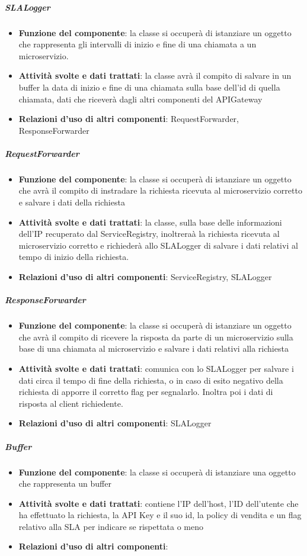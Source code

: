 \subparagraph{SLALogger}
\begin{itemize}
	\item \textbf{Funzione del componente}: la classe si occuper\`{a} di istanziare un oggetto che rappresenta gli intervalli di inizio e fine di una chiamata a un microservizio.
	\item \textbf{Attivit\`{a} svolte e dati trattati}:  la classe avr\`{a} il compito di salvare in un buffer la data di inizio e fine di una chiamata sulla base dell'id di quella chiamata, dati che ricever\`{a} dagli altri componenti del APIGateway
	\item \textbf{Relazioni d'uso di altri componenti}: RequestForwarder, ResponseForwarder
\end{itemize}

\subparagraph{RequestForwarder}
\begin{itemize}
	\item \textbf{Funzione del componente}: la classe si occuper\`{a} di istanziare un oggetto che avr\`{a} il compito di instradare la richiesta ricevuta al microservizio corretto e salvare i dati della richiesta
	\item \textbf{Attivit\`{a} svolte e dati trattati}: la classe, sulla base delle informazioni dell'IP recuperato dal ServiceRegistry, inoltrera\`{a} la richiesta ricevuta al microservizio corretto e richieder\`{a} allo SLALogger di salvare i dati relativi al tempo di inizio della richiesta.
	\item \textbf{Relazioni d'uso di altri componenti}: ServiceRegistry, SLALogger
\end{itemize}

\subparagraph{ResponseForwarder}
\begin{itemize}
	\item \textbf{Funzione del componente}: la classe si occuper\`{a} di istanziare un oggetto che avr\`{a} il compito di ricevere la risposta da parte di un microservizio sulla base di una chiamata al microservizio e salvare i dati relativi alla richiesta
	\item \textbf{Attivit\`{a} svolte e dati trattati}: comunica con lo SLALogger per salvare i dati circa il tempo di fine della richiesta, o in caso di esito negativo della richiesta di apporre il corretto flag per segnalarlo. Inoltra poi i dati di risposta al client richiedente.
	\item \textbf{Relazioni d'uso di altri componenti}: SLALogger
\end{itemize}

\subparagraph{Buffer}
\begin{itemize}
	\item \textbf{Funzione del componente}: la classe si occuper\`{a} di istanziare una oggetto che rappresenta un buffer 
	\item \textbf{Attivit\`{a} svolte e dati trattati}: contiene l'IP dell'host, l'ID dell'utente che ha effettuato la richiesta, la API Key e il suo id, la policy di vendita e un flag relativo alla SLA per indicare se rispettata o meno
	\item \textbf{Relazioni d'uso di altri componenti}: 
\end{itemize}

